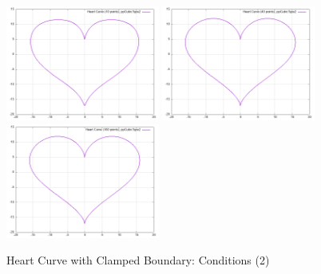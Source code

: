 \documentclass{article}
\begin{document}
\begin{figure}[H]
    \centering
    \includegraphics[width=0.45\textwidth]{../figure/pp2spline_plot_10.png}
    \includegraphics[width=0.45\textwidth]{../figure/pp2spline_plot_40.png}
    \includegraphics[width=0.45\textwidth]{../figure/pp2spline_plot_160.png}
    \caption{Heart Curve with Clamped Boundary: Conditions (2)}
    \label{fig:clamped}
\end{figure}
\end{document}
